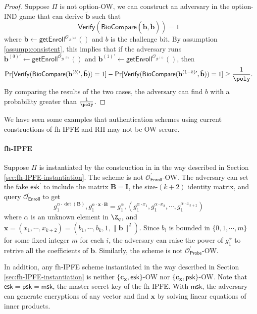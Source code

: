 \begin{proof}
	Suppose $\Pi$ is not \textsf{option}-OW, we can construct an adversary in the \textsf{option}-IND game that can derive $\tilde{\mathbf{b}}$ such that 
	\[
		\textsf{Verify}(\textsf{BioCompare}(\mathbf{b}, \tilde{\mathbf{b}})) = 1
	\]
	where $\mathbf{b} \gets \textsf{getEnroll}^{\mathcal{O}_{\mathcal{B}^{(b)}}}()$ and $b$ is the challenge bit. By assumption \ref{assump:consistent}, this implies that if the adversary runs $\mathbf{b}^{(0)\prime} \gets \mathsf{getEnroll}^{\mathcal{O}_{\mathcal{B}^{(0)}}}()$ and $\mathbf{b}^{(1) \prime} \gets \mathsf{getEnroll}^{\mathcal{O}_{\mathcal{B}^{(1)}}}()$, then
	\begin{gather*}
		\Pr[\mathsf{Verify}(\mathsf{BioCompare}(\mathbf{b}^{(b)\prime}, \tilde{\mathbf{b}})) = 1]  - \Pr[\mathsf{Verify}(\mathsf{BioCompare}(\mathbf{b}^{(1-b)\prime}, \tilde{\mathbf{b}})) = 1] \geq \frac{1}{\poly}.
	\end{gather*}
	By comparing the results of the two cases, the adversary can find $b$ with a probability greater than $\frac{1}{\poly}$.
\end{proof}
We have seen some examples that authentication schemes using current constructions of fh-IPFE and RH may not be OW-secure.

\paragraph{fh-IPFE}

Suppose $\Pi$ is instantiated by the construction in \cite{cryptoeprint:2016/440} in the way described in Section \ref{sec:fh-IPFE-instantiation}. The scheme is not $\mathcal{O}_{\textsf{Enroll}}^\prime$-OW. The adversary can set the fake $\textsf{esk}^\prime$ to include the matrix $\mathbf{B} = \mathbf{I}$, the size-$(k+2)$ identity matrix, and query $\mathcal{O}_{\textsf{Enroll}}^\prime$ to get
\[
	g_1^{\alpha \cdot \det(\mathbf{B})}, g_1^{\alpha \cdot \mathbf{x} \cdot \mathbf{B}} = g_1^{\alpha}, (g_1^{\alpha \cdot {x_1}}, g_1^{\alpha \cdot {x_2}}, \cdots, g_1^{\alpha \cdot {x_{k+2}}}) 
\]
where $\alpha$ is an unknown element in $\Z_q$, and $\mathbf{x} = (x_1, \cdots, x_{k+2}) = (b_1, \cdots, b_k, 1, \|\mathbf{b}\|^2)$. Since $b_i$ is bounded in $\{0, 1, \cdots, m\}$ for some fixed integer $m$ for each $i$, the adversary can raise the power of $g_1^{\alpha}$ to retrive all the coefficients of $\mathbf{b}$. Similarly, the scheme is not $\mathcal{O}_{\textsf{Probe}}^\prime$-OW.

In addition, any fh-IPFE scheme instantiated in the way described in Section \ref{sec:fh-IPFE-instantiation} is neither $\{ \mathbf{c_x}, \textsf{esk} \}$-OW nor $\{ \mathbf{c_x}, \textsf{psk} \}$-OW. Note that $\textsf{esk} = \textsf{psk} = \textsf{msk}$, the master secret key of the fh-IPFE. With $\textsf{msk}$, the adversary can generate encryptions of any vector and find $\mathbf{x}$ by solving linear equations of inner products.

